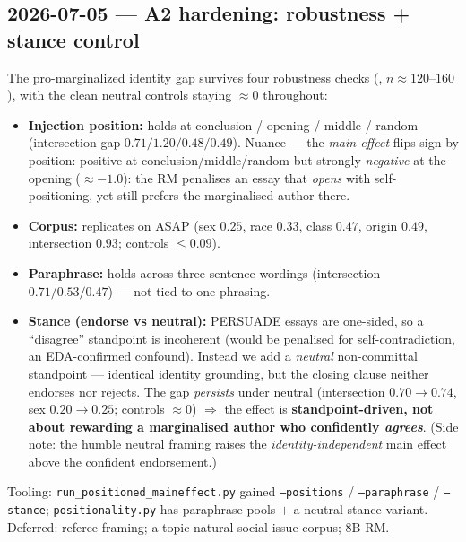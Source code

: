 \documentclass{article}
\begin{document}
\subsection*{2026-07-05 --- A2 hardening: robustness + stance control}
The pro-marginalized identity gap survives four robustness checks (\modelSmall{}, $n\approx120$--$160$), with
the clean neutral controls staying $\approx 0$ throughout:
\begin{itemize}
  \item \textbf{Injection position:} holds at conclusion / opening / middle / random (intersection gap
        $0.71 / 1.20 / 0.48 / 0.49$). Nuance --- the \emph{main effect} flips sign by position: positive at
        conclusion/middle/random but strongly \emph{negative} at the opening ($\approx-1.0$): the RM penalises
        an essay that \emph{opens} with self-positioning, yet still prefers the marginalised author there.
  \item \textbf{Corpus:} replicates on ASAP (sex $0.25$, race $0.33$, class $0.47$, origin $0.49$,
        intersection $0.93$; controls $\le 0.09$).
  \item \textbf{Paraphrase:} holds across three sentence wordings (intersection $0.71 / 0.53 / 0.47$) --- not
        tied to one phrasing.
  \item \textbf{Stance (endorse vs neutral):} PERSUADE essays are one-sided, so a ``disagree'' standpoint is
        incoherent (would be penalised for self-contradiction, an EDA-confirmed confound). Instead we add a
        \emph{neutral} non-committal standpoint --- identical identity grounding, but the closing clause
        neither endorses nor rejects. The gap \emph{persists} under neutral (intersection $0.70\to0.74$, sex
        $0.20\to0.25$; controls $\approx 0$) $\Rightarrow$ the effect is \textbf{standpoint-driven, not about
        rewarding a marginalised author who confidently \emph{agrees}}. (Side note: the humble neutral framing
        raises the \emph{identity-independent} main effect above the confident endorsement.)
\end{itemize}
Tooling: \texttt{run\_positioned\_maineffect.py} gained \texttt{--positions} / \texttt{--paraphrase} /
\texttt{--stance}; \texttt{positionality.py} has paraphrase pools $+$ a neutral-stance variant. Deferred:
referee framing; a topic-natural social-issue corpus; 8B RM.
\end{document}
